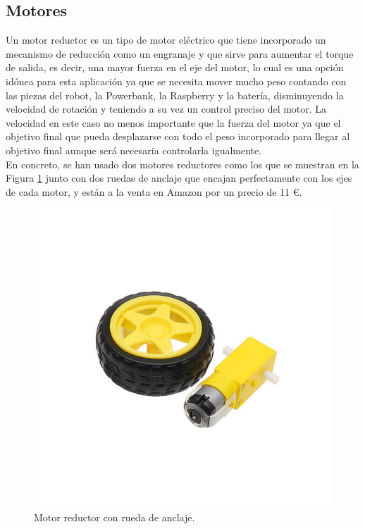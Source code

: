 \vspace{2cm}

\subsection{Motores}
\label{subsec:motores}

Un motor reductor es un tipo de motor eléctrico que tiene incorporado un mecanismo de reducción como un engranaje y que sirve para aumentar el torque de salida, es decir, una mayor fuerza en el eje del motor, lo cual es una opción idónea para esta aplicación ya que se necesita mover mucho peso contando con las piezas del robot, la Powerbank, la Raspberry y la batería, disminuyendo la velocidad de rotación y teniendo a su vez un control preciso del motor. La velocidad en este caso no menos importante que la fuerza del motor ya que el objetivo final que pueda desplazarse con todo el peso incorporado para llegar al objetivo final aunque será necesaria controlarla igualmente. \\

En concreto, se han usado dos motores reductores como los que se muestran en la Figura \ref{fig:Motor} junto con dos ruedas de anclaje que encajan perfectamente con los ejes de cada motor, y están a la venta en Amazon por un precio de 11 \euro. 

\begin{figure}[H]
  \centering
  \includegraphics[scale=0.35]{figs/motor} %
  \caption{Motor reductor con rueda de anclaje.}
  \label{fig:Motor}
\end{figure}

